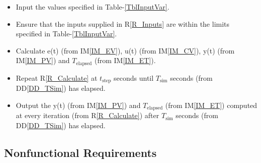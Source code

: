 \documentclass[12pt]{article}
\newcommand{\ddref}[1]{DD\ref{#1}}
\newcommand{\iref}[1]{IM\ref{#1}}
\newcounter{reqnum} %
\newcommand{\rref}[1]{R\ref{#1}}
\begin{document}
\noindent \begin{itemize}

\item[R\refstepcounter{reqnum}\thereqnum \label{R_Inputs}:]  Input the values specified in Table-\ref{TblInputVar}.

    
\item[R\refstepcounter{reqnum}\thereqnum \label{R_InputCheck}:]  Ensure that the inputs supplied in \rref{R_Inputs} are within the 
    limits specified in Table-\ref{TblInputVar}.

\item[R\refstepcounter{reqnum}\thereqnum \label{R_Calculate}:]  Calculate e(t) (from \iref{IM_EV}), u(t) 
    (from \iref{IM_CV}), y(t) (from \iref{IM_PV}) and $T_\text{elapsed}$ (from 
    \iref{IM_ET}).
   
\item[R\refstepcounter{reqnum}\thereqnum \label{R_SimTime}:] Repeat 
    \rref{R_Calculate} at $t_\text{step}$ seconds until $T_\text{sim}$ seconds 
    (from \ddref{DD_TSim}) has elapsed. 
  
\item[R\refstepcounter{reqnum}\thereqnum \label{R_Output}:]  Output the y(t) (from \iref{IM_PV}) and $T_\text{elapsed}$ 
    (from \iref{IM_ET}) computed at every iteration (from \rref{R_Calculate})
    after $T_\text{sim}$ seconds (from \ddref{DD_TSim}) has elapsed. 

  
\end{itemize}

\subsection{Nonfunctional Requirements}

\end{document}
